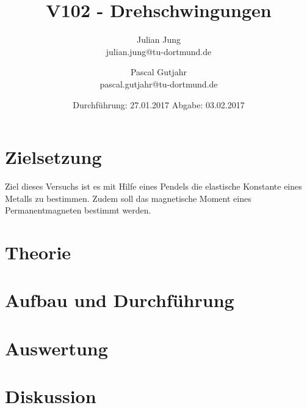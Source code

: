 

\title{V102 - Drehschwingungen}
\author{Julian Jung \\ julian.jung@tu-dortmund.de
  \and Pascal Gutjahr \\ pascal.gutjahr@tu-dortmund.de}
  \date{Durchführung: 27.01.2017
  \hspace{3em}
  Abgabe: 03.02.2017}
  
\maketitle
\newpage
\tableofcontents
\newpage
\section{Zielsetzung}
Ziel dieses Versuchs ist es mit Hilfe eines Pendels die elastische Konstante
eines Metalls zu bestimmen. Zudem soll das magnetische Moment eines
Permanentmagneten bestimmt werden.
\section{Theorie}
 
\section{Aufbau und Durchführung}
 
\section{Auswertung}
 
\section{Diskussion}
 
\printbibliography

